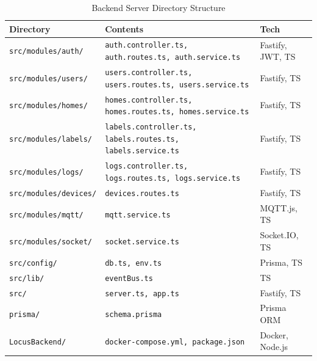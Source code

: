 \documentclass[conference]{IEEEtran}
\begin{document}
\begin{table}[H]
\caption{Backend Server Directory Structure}
\def\arraystretch{1.2}
\footnotesize
\begin{tabular}{|>{\raggedright\arraybackslash}p{2.6cm}|>{\raggedright\arraybackslash}p{3.5cm}|p{1.4cm}|}
\hline
\textbf{Directory} & \textbf{Contents} & \textbf{Tech} \\
\hline
\texttt{src/modules/}\newline\texttt{auth/} & \texttt{auth.controller.ts, auth.routes.ts, auth.service.ts} & Fastify, JWT, TS \\
\hline
\texttt{src/modules/}\newline\texttt{users/} & \texttt{users.controller.ts, users.routes.ts, users.service.ts} & Fastify, TS \\
\hline
\texttt{src/modules/}\newline\texttt{homes/} & \texttt{homes.controller.ts, homes.routes.ts, homes.service.ts} & Fastify, TS \\
\hline
\texttt{src/modules/}\newline\texttt{labels/} & \texttt{labels.controller.ts, labels.routes.ts, labels.service.ts} & Fastify, TS \\
\hline
\texttt{src/modules/}\newline\texttt{logs/} & \texttt{logs.controller.ts, logs.routes.ts, logs.service.ts} & Fastify, TS \\
\hline
\texttt{src/modules/}\newline\texttt{devices/} & \texttt{devices.routes.ts} & Fastify, TS \\
\hline
\texttt{src/modules/}\newline\texttt{mqtt/} & \texttt{mqtt.service.ts} & MQTT.js, TS \\
\hline
\texttt{src/modules/}\newline\texttt{socket/} & \texttt{socket.service.ts} & Socket.IO, TS \\
\hline
\texttt{src/config/} & \texttt{db.ts, env.ts} & Prisma, TS \\
\hline
\texttt{src/lib/} & \texttt{eventBus.ts} & TS \\
\hline
\texttt{src/} & \texttt{server.ts, app.ts} & Fastify, TS \\
\hline
\texttt{prisma/} & \texttt{schema.prisma} & Prisma ORM \\
\hline
\texttt{LocusBackend/} & \texttt{docker-compose.yml, package.json} & Docker, Node.js \\
\hline
\end{tabular}
\end{table}
\end{document}
